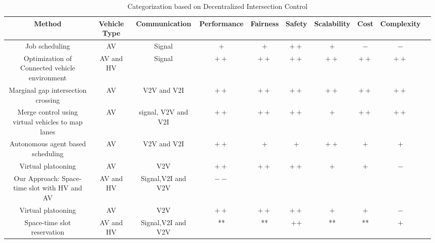 \documentclass{book}
\newcommand{\jk}[1]{\todo[inline]{JK: #1}}
\begin{document}
\begin{landscape}
\begin{table}
\label{tab:3}
\caption{Categorization based on Decentralized Intersection Control}
\begin{tabular}{|c|c|c|c|c|c|c|c|c|c|}\hline
Method & \multicolumn{1}{m{2cm}|}{Vehicle Type} & \multicolumn{1}{m{1.5cm}|}{\small Communication} & \multicolumn{1}{m{2cm}|}{Performance} & Fairness & Safety & Scalability & \multicolumn{1}{|m{2.2cm}|}{Cost} & Complexity \\\hline
Job scheduling & AV & Signal & $+$ &  $+$ & $++$ & $+$ & {$-$} & {$-$}  \\\hline
\multicolumn{1}{|m{3cm}|}{Optimization of Connected vehicle environment} & AV and HV &  Signal & $++$ & $++$ & $++$ & $++$&  {$++$} & {$++$}\\\hline
\multicolumn{1}{|m{3cm}|}{Marginal gap intersection crossing} & AV & V2V and V2I & $++$ & $++$  & $++$ & $++$ & {$++$} & {$++$} \\\hline
\multicolumn{1}{|m{3cm}|}{Merge control using virtual vehicles to map lanes} & AV &  \multicolumn{1}{m{3cm}|}{signal, V2V and V2I} & $++$ & $++$ & $++$ & $+$ & {$++$} & {$++$}  \\\hline
\multicolumn{1}{|m{3cm}|}{Autonomous agent based scheduling} & AV &  V2V and V2I & $++$ & $+$ & $+$ & $++$ & {$+$} & {$+$} \\\hline
\multicolumn{1}{|m{3cm}|}{Virtual platooning} & AV &  V2V & $++$ & $++$ & $++$ & $+$ & {$+$} & {$-$}\\\hline
\multicolumn{1}{|m{3cm}|}{Our Approach:  Space-time slot with HV and AV} & AV and HV & Signal,V2I and V2V &  $--$ &   &  &  &  &   \\\hline
\multicolumn{1}{|m{3cm}|}{Virtual platooning} & AV &  V2V & $++$ & $++$ & $++$ & $+$ & {$+$} & {$-$}\\\hline
\multicolumn{1}{|m{3cm}|}{Space-time slot reservation} & AV and HV & Signal,V2I and V2V &  **& ** & {++} &** &** & +  \\\hline



\end{tabular}
\end{table}
\end{landscape}
\end{document}
